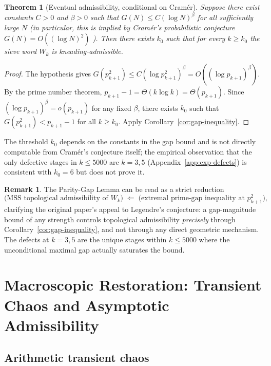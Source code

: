 \documentclass{iopjournal}
\newtheorem{theorem}{Theorem}
\theoremstyle{definition}
\newtheorem{remark}{Remark}
\begin{document}
\begin{theorem}[Eventual admissibility, conditional on Cram\'er]
\label{thm:eventual}
Suppose there exist constants $C > 0$ and $\beta > 0$ such that
$G(N) \leq C (\log N)^{\beta}$ for all sufficiently large $N$
(in particular, this is implied by Cram\'er's probabilistic conjecture
$G(N) = O((\log N)^2)$ \cite{cramer1936order}). Then there exists
$k_0$ such that for every $k \geq k_0$ the sieve word $W_k$ is
kneading-admissible.
\end{theorem}

\begin{proof}
The hypothesis gives
$G(p_{k+1}^2) \leq C (\log p_{k+1}^2)^\beta = O((\log p_{k+1})^\beta)$.
By the prime number theorem,
$p_{k+1} - 1 = \Theta(k \log k) = \Theta(p_{k+1})$. Since
$(\log p_{k+1})^\beta = o(p_{k+1})$ for any fixed $\beta$, there exists
$k_0$ such that $G(p_{k+1}^2) < p_{k+1} - 1$ for all $k \geq k_0$.
Apply Corollary~\ref{cor:gap-inequality}.
\end{proof}

The threshold $k_0$ depends on the constants in the gap bound and is
not directly computable from Cram\'er's conjecture itself; the
empirical observation that the only defective stages in $k \leq 5000$
are $k = 3, 5$ (Appendix~\ref{app:exp-defects}) is consistent with
$k_0 = 6$ but does not prove it.

\begin{remark}
The Parity-Gap Lemma can be read as a strict reduction
\[
    \text{(MSS topological admissibility of } W_k\text{)}
    \;\Longleftarrow\;
    \text{(extremal prime-gap inequality at } p_{k+1}^2\text{)},
\]
clarifying the original paper's appeal to Legendre's conjecture: a
gap-magnitude bound of any strength controls topological admissibility
\emph{precisely} through Corollary~\ref{cor:gap-inequality}, and not
through any direct geometric mechanism. The defects at $k = 3, 5$ are
the unique stages within $k \leq 5000$ where the unconditional maximal
gap actually saturates the bound.
\end{remark}

\section{Macroscopic Restoration: Transient Chaos and Asymptotic Admissibility}
\label{sec:macro}

\subsection{Arithmetic transient chaos}
\end{document}
